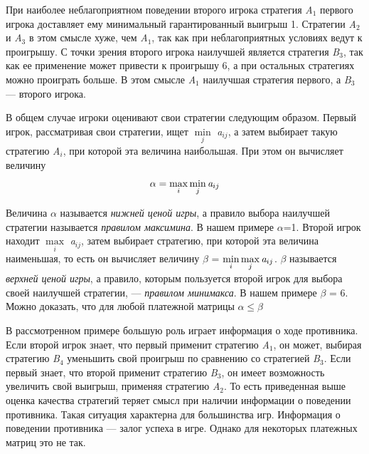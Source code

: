 При наиболее неблагоприятном поведении второго игрока стратегия \emph{A$_{1}$} первого игрока доставляет ему минимальный гарантированный выигрыш 1. Стратегии \emph{A$_{2}$} и \emph{A$_{3}$} в этом смысле хуже, чем \emph{A$_{1}$}, так как при неблагоприятных условиях ведут к проигрышу. С точки зрения второго игрока наилучшей является стратегия \emph{B$_{3}$}, так как ее применение может привести к проигрышу 6, а при остальных стратегиях можно проиграть больше. В этом смысле \emph{A$_{1}$} наилучшая стратегия первого, а \emph{B$_{3}$} — второго игрока.

В общем случае игроки оценивают свои стратегии следующим образом. Первый игрок, рассматривая свои стратегии, ищет $\min\limits_{j}$ \emph{a$_{ij}$}, а затем выбирает такую стратегию \emph{A$_{i}$}, при которой эта величина наибольшая. При этом он вычисляет величину
\begin{equation}
\label{equation_4_1}
\alpha = \max_{i} \min_{j} \emph{a$_{ij}$}
\end{equation}

Величина $\alpha$ называется \emph{нижней ценой игры}, а правило выбора наилучшей стратегии называется \emph{правилом максимина}. В нашем примере $\alpha$=1. Второй игрок находит $\max\limits_{i}$ \emph{a$_{ij}$}, затем выбирает стратегию, при которой эта величина наименьшая, то есть он вычисляет величину  $\beta$ = $\min\limits_{i} \max\limits_{j} \emph{a$_{ij}$}$. $\beta$ называется \emph{верхней ценой игры}, а правило, которым пользуется второй игрок для выбора своей наилучшей стратегии, — \emph{правилом минимакса}. В нашем примере $\beta$ = 6. Можно доказать, что для любой платежной матрицы $\alpha \leqslant \beta$

В рассмотренном примере большую роль  играет  информация  о  ходе противника. Если второй игрок знает, что первый применит стратегию \emph{A$_{1}$}, он может, выбирая стратегию \emph{B$_{4}$} уменьшить свой проигрыш по сравнению со стратегией \emph{B$_{3}$}. Если первый знает, что второй применит стратегию \emph{B$_{3}$}, он имеет возможность увеличить свой выигрыш, применяя стратегию \emph{A$_{2}$}. То есть приведенная выше оценка качества стратегий теряет смысл при наличии информации о поведении противника. Такая ситуация характерна для большинства игр. Информация о поведении противника — залог успеха в игре. Однако для некоторых платежных матриц это не так.



